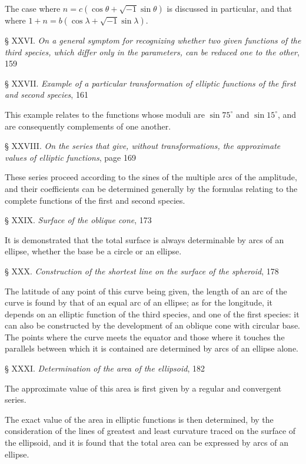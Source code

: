 \documentclass{article}
\begin{document}
The case where $n=c(\cos\theta+\sqrt{-1}\sin\theta)$ is discussed in particular, and that where $1+n=b(\cos\lambda+\sqrt{-1}\sin\lambda)$.

§ XXVI. \emph{On a general symptom for recognizing whether two given functions of the third species, which differ only in the parameters, can be reduced one to the other}, 159

§ XXVII. \emph{Example of a particular transformation of elliptic functions of the first and second species}, 161

This example relates to the functions whose moduli are $\sin75^{\circ}$ and $\sin15^{\circ}$, and are consequently complements of one another.


§ XXVIII. \emph{On the series that give, without transformations, the approximate values of elliptic functions}, page 169

These series proceed according to the sines of the multiple arcs of the amplitude, and their coefficients can be determined generally by the formulas relating to the complete functions of the first and second species.

§ XXIX. \emph{Surface of the oblique cone}, 173

It is demonstrated that the total surface is always determinable by arcs of an ellipse, whether the base be a circle or an ellipse.

§ XXX. \emph{Construction of the shortest line on the surface of the spheroid}, 178

The latitude of any point of this curve being given, the length of an arc of the curve is found by that of an equal arc of an ellipse; as for the longitude, it depends on an elliptic function of the third species, and one of the first species: it can also be constructed by the development of an oblique cone with circular base. The points where the curve meets the equator and those where it touches the parallels between which it is contained are determined by arcs of an ellipse alone.

§ XXXI. \emph{Determination of the area of the ellipsoid}, 182

The approximate value of this area is first given by a regular and convergent series.

The exact value of the area in elliptic functions is then determined, by the consideration of the lines of greatest and least curvature traced on the surface of the ellipsoid, and it is found that the total area can be expressed by arcs of an ellipse.
\end{document}
